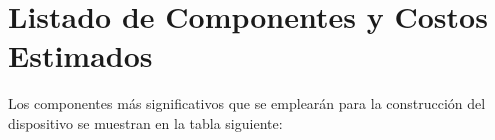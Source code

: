 \section{Listado de Componentes y Costos Estimados}
Los componentes más significativos que se emplearán para la construcción del dispositivo se muestran en la tabla siguiente:

